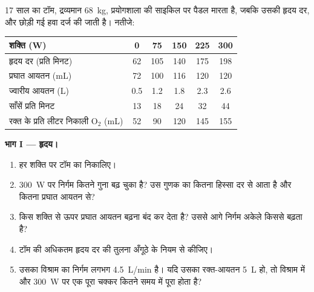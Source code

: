 \begin{problem}
\label{pb:g10:heart-lungs-effort:1}
17 साल का टॉम, द्रव्यमान \qty{68}{kg}, प्रयोगशाला की साइकिल पर पैडल
मारता है, जबकि उसकी हृदय दर,  और छोड़ी गई हवा दर्ज की जाती है।
नतीजे:

\begin{center}
\begin{tabular}{lccccc}
शक्ति (\unit{W}) & 0 & 75 & 150 & 225 & 300 \\ \hline
हृदय दर (प्रति मिनट) & 62 & 105 & 140 & 175 & 198 \\
प्रघात आयतन (\unit{mL}) & 72 & 100 & 116 & 120 & 120 \\
ज्वारीय आयतन (\unit{L}) & 0.5 & 1.2 & 1.8 & 2.3 & 2.6 \\
साँसें प्रति मिनट & 13 & 18 & 24 & 32 & 44 \\
रक्त के प्रति लीटर निकाली $\mathrm{O_2}$ (\unit{mL}) & 52 & 90 & 120 & 145 & 155 \\
\end{tabular}
\end{center}

\medskip
\noindent\textbf{भाग I --- हृदय।}
\begin{enumerate}
  \item हर शक्ति पर टॉम का  निकालिए।
  \item \qty{300}{W} पर निर्गम कितने गुना बढ़ चुका है? उस गुणक का कितना
        हिस्सा दर से आता है और कितना प्रघात आयतन से?
  \item किस शक्ति से ऊपर प्रघात आयतन बढ़ना बंद कर देता है? उससे आगे
        निर्गम अकेले किससे बढ़ता है?
  \item टॉम की अधिकतम हृदय दर की तुलना अँगूठे के नियम से कीजिए।
  \item उसका विश्राम का निर्गम लगभग \qty{4.5}{L/min} है। यदि उसका
        रक्त-आयतन \qty{5}{L} हो, तो विश्राम में और \qty{300}{W} पर एक
        पूरा चक्कर कितने समय में पूरा होता है?
\end{enumerate}


\end{problem}
